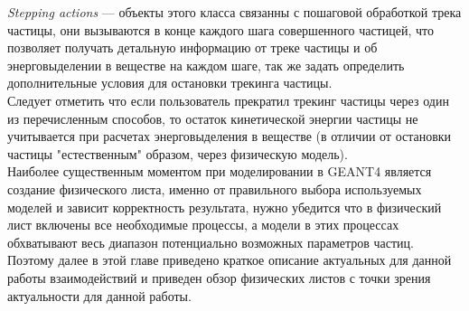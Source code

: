 \textit{Stepping actions} --- объекты этого класса связанны с пошаговой обработкой трека частицы, они вызываются в конце каждого шага совершенного частицей, что позволяет  получать детальную информацию от треке частицы и об энерговыделении в веществе на каждом шаге, так же задать определить дополнительные условия для остановки трекинга частицы.\\
Следует отметить что если пользователь прекратил трекинг частицы через один из перечисленным способов, то остаток кинетической энергии частицы не учитывается при расчетах энерговыделения в веществе (в отличии от остановки частицы "естественным" образом, через физическую модель).\\
Наиболее существенным моментом при моделировании в GEANT4 является создание физического листа, именно от правильного выбора используемых моделей и зависит корректность результата, нужно убедится что в физический лист включены
все необходимые процессы, а модели в этих процессах обхватывают весь диапазон потенциально возможных параметров частиц. Поэтому далее в этой главе  приведено краткое описание актуальных для данной работы взаимодействий и приведен обзор физических листов с точки зрения актуальности для данной работы.


